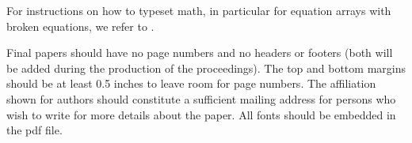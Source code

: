\documentclass[conference,letterpaper]{IEEEtran}
\begin{document}



For instructions on how to typeset math, in particular for equation
arrays with broken equations, we refer to \cite{typesetmoser}.

Final papers should have no page numbers and no headers or footers (both will be added during the production of the proceedings).
The top and bottom margins should be at least 0.5 inches to leave room for page numbers.
The affiliation shown for authors should constitute a sufficient mailing
address for persons who wish to write for more details about the
paper.
All fonts should be embedded in the pdf file.
\end{document}
